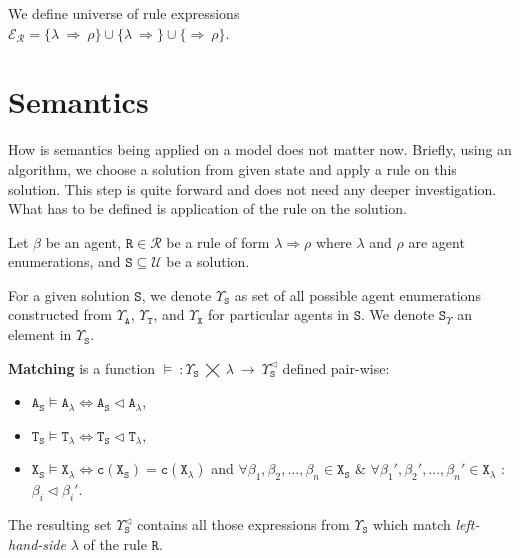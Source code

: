 \documentclass{entcs}
\renewcommand{\~}[0]{\texttildelow}
\begin{document}
\begin{theorem}
We define universe of rule expressions\\ $\mathcal{E}_\mathcal{R} = \{ \lambda ~\Rightarrow~ \rho \} \cup \{ \lambda ~\Rightarrow  \} \cup \{ \Rightarrow~ \rho \}$.
\end{theorem}

\section{Semantics}

How is semantics being applied on a model does not matter now. Briefly, using an algorithm, we choose a solution from given state and apply a rule on this solution. This step is quite forward and does not need any deeper investigation. What has to be defined is application of the rule on the solution.

Let $\beta$ be an agent, $\mathtt{R} \in \mathcal{R}$ be a rule of form $\lambda \Rightarrow \rho$ where $\lambda$ and $\rho$ are agent enumerations, and $\mathtt{S} \subseteq \mathcal{U}$ be a solution. 

\begin{definition}
For a given solution $\mathtt{S}$, we denote $\Upsilon_\mathtt{S}$ as set of all possible agent enumerations constructed from $\Upsilon_\mathtt{A}$, $\Upsilon_\mathtt{T}$, and $\Upsilon_\mathtt{X}$ for particular agents in $\mathtt{S}$. We denote $\mathtt{S}_\Upsilon$ an element in $\Upsilon_\mathtt{S}$.
\end{definition}

\begin{definition}
$ $ \\
\textbf{Matching} is a function $\models ~: \Upsilon_\mathtt{S}~\bigtimes~\lambda~\rightarrow~\Upsilon_\mathtt{S}^{\lhd}$ defined pair-wise:

\begin{itemize}
	\item $\mathtt{A}_\mathtt{S} \models \mathtt{A}_{\lambda} \Leftrightarrow \mathtt{A}_\mathtt{S} \lhd \mathtt{A}_{\lambda}$,
	\item $\mathtt{T}_\mathtt{S} \models \mathtt{T}_{\lambda} \Leftrightarrow \mathtt{T}_\mathtt{S} \lhd \mathtt{T}_{\lambda}$,
	\item $\mathtt{X}_\mathtt{S} \models \mathtt{X}_{\lambda} \Leftrightarrow \mathtt{c}(\mathtt{X}_\mathtt{S}) = \mathtt{c}(\mathtt{X}_{\lambda})$ and $\forall \beta_1, \beta_2, ..., \beta_n \in \mathtt{X}_\mathtt{S} $ \& $\forall \beta_1', \beta_2', ..., \beta_n' \in \mathtt{X}_{\lambda}$ : $\beta_i \lhd \beta_i'$.
	
\end{itemize}
\noindent The resulting set $\Upsilon_\mathtt{S}^{\lhd}$ contains all those expressions from $\Upsilon_\mathtt{S}$ which match \emph{left-hand-side} $\lambda$ of the rule $\mathtt{R}$.

\end{definition}
\end{document}
